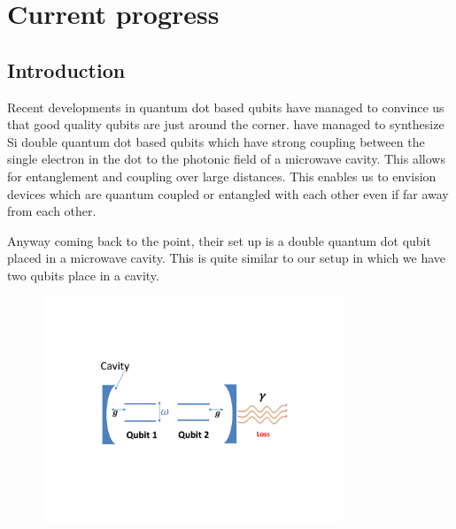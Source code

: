 \chapter{Current progress}
\section{Introduction}
Recent developments in quantum dot based qubits have managed to convince us that good quality qubits are just around the corner. \cite{petta} have managed to synthesize Si double quantum dot based qubits which have strong coupling between the single electron in the dot to the photonic field of a microwave cavity. This allows for entanglement and coupling over large distances. This enables us to envision devices which are quantum coupled or entangled with each other even if far away from each other. 
\par
Anyway coming back to the point, their set up is a double quantum dot qubit placed in a microwave cavity. This is quite similar to our setup in which we have two qubits place in a cavity.
\begin{figure}
\centering
\includegraphics[width=0.8\textwidth]{Figr1a} 
\end{figure}

